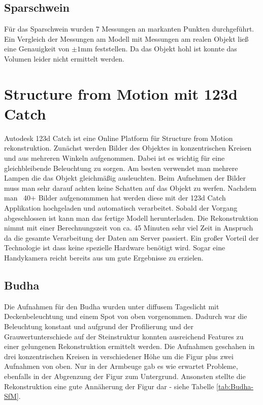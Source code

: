 \documentclass[]{article}
\begin{document}
\subsection{Sparschwein}
Für das Sparschwein wurden 7 Messungen an markanten Punkten durchgeführt. Ein Vergleich der Messungen am Modell mit Messungen am realen Objekt ließ eine Genauigkeit von $\pm 1$mm feststellen. Da das Objekt hohl ist konnte das Volumen leider nicht ermittelt werden.

\section{Structure from Motion mit 123d Catch} %

Autodesk 123d Catch ist eine Online Platform für Structure from Motion rekonstruktion. Zunächst werden Bilder des Objektes in konzentrischen Kreisen und aus mehreren Winkeln aufgenommen. Dabei ist es wichtig für eine gleichbleibende Beleuchtung zu sorgen. Am besten verwendet man mehrere Lampen die das Objekt gleichmäßig ausleuchten. Beim Aufnehmen der Bilder muss man sehr darauf achten keine Schatten auf das Objekt zu werfen. Nachdem man ~40+ Bilder aufgenommmen hat werden diese mit der 123d Catch Applikation hochgeladen und automatisch verarbeitet. Sobald der Vorgang abgeschlossen ist kann man das fertige Modell herunterladen. Die Rekonstruktion nimmt mit einer Berechnungszeit von ca. 45 Minuten sehr viel Zeit in Anspruch da die gesamte Verarbeitung der Daten am Server passiert. Ein großer Vorteil der Technologie ist dass keine spezielle Hardware benötigt wird. Sogar eine Handykamera reicht bereits aus um gute Ergebnisse zu erzielen.

\subsection{Budha}

Die Aufnahmen für den Budha wurden unter diffusem Tageslicht mit Deckenbeleuchtung und einem Spot von oben vorgenommen. Dadurch war die Beleuchtung konstant und aufgrund der Profilierung und der Grauwertunterschiede auf der Steinstruktur konnten ausreichend Features zu einer gelungenen Rekonstruktion ermittelt werden. Die Aufnahmen geschahen in drei konzentrischen Kreisen in verschiedener Höhe um die Figur plus zwei Aufnahmen von oben.
Nur in der Armbeuge gab es wie erwartet Probleme, ebenfalls in der Abgrenzung der Figur zum Untergrund. Ansonsten stellte die Rekonstruktion eine gute Annäherung der Figur dar - siehe Tabelle \ref{tab:Budha-SfM}.
\end{document}

